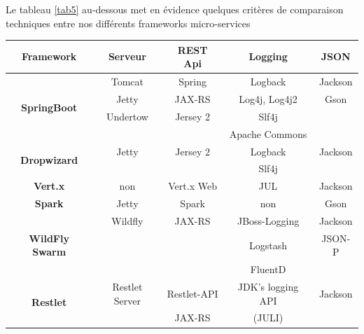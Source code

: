 \documentclass[12pt, a4paper, openany]{report}
\begin{document}
   Le tableau \ref{tab5} au-dessous met en évidence quelques critères de comparaison techniques entre nos différents frameworks micro-services
   
   \begin{center}
   \begin{tabular}{|c|c|c|c|c|}
    \hline
    
    \rowcolor[rgb]{0.5,0.5,0}\textbf{Framework}&\textbf{Serveur}&\textbf{REST Api}&\textbf{Logging} &\textbf{JSON}  \\ \hline
    
    \multirow{4}{*}{\textbf{SpringBoot}} & Tomcat & Spring & Logback&Jackson\\ 
                                        & Jetty & JAX-RS & Log4j, Log4j2&Gson\\ 
                                        & Undertow & Jersey 2 & Slf4j& \\
                                         &  &  & Apache Commons &\\ \hline
     
    \multirow{2}{*}{\textbf{Dropwizard}} & Jetty & Jersey 2 & Logback&Jackson\\ 
                                         &  &  & Slf4j& \\ \hline
     
     \textbf{Vert.x} &non& Vert.x Web & JUL&Jackson\\ \hline
     
     \textbf{Spark} & Jetty & Spark & non&Gson\\ \hline
     
     \multirow{3}{*}{\textbf{WildFly Swarm}} & Wildfly & JAX-RS & JBoss-Logging&Jackson \\ 
                                             &  &  & Logstash&JSON-P \\ 
                                             &  &  & FluentD& \\ \hline
     
     \multirow{2}{*}{\textbf{Restlet}} &Restlet Server& Restlet-API & JDK's logging API&Jackson\\ %
                                        & & JAX-RS & (JULI)& \\ \hline
     
   \end{tabular}
   \label{tab5}
   \end{center}
   
\end{document}
